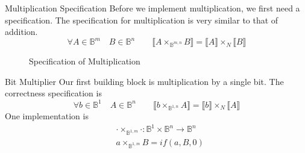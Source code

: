 \documentclass[aspectratio=169]{beamer}
\begin{document}
\begin{frame}[fragile]{Multiplication Specification}
  Before we implement multiplication, we first need a specification.
  \pause The specification for multiplication is very similar to that of addition.
  \pause
  \[\forall A \in \mathbb{B}^{m} \quad B \in \mathbb{B}^{n} \qquad \llbracket A \times_{\mathbb{B}^{m,n}} B \rrbracket = \llbracket A \rrbracket \times_{N} \llbracket B \rrbracket\]

  \begin{figure}
\caption{Specification of Multiplication}
\end{figure}
\end{frame}


\begin{frame}{Bit Multiplier}
  Our first building block is multiplication by a single bit.
  \pause The correctness specification is
  \[\forall b \in \mathbb{B}^{1} \quad A \in \mathbb{B}^{n} \qquad \llbracket b \times_{\mathbb{B}^{1,n}} A \rrbracket = \llbracket b \rrbracket \times_{N} \llbracket A \rrbracket\]
  \pause
  One implementation is
\begin{align*}\label{eq:mulbita}
  &\cdot \times_{\mathbb{B}^{1,m}} \cdot : \mathbb{B}^{1} \times \mathbb{B}^{n} \to \mathbb{B}^{n}\\
  &a \times_{\mathbb{B}^{1,m}} B =  if(a,B,0)
\end{align*}


\end{frame}
\end{document}
